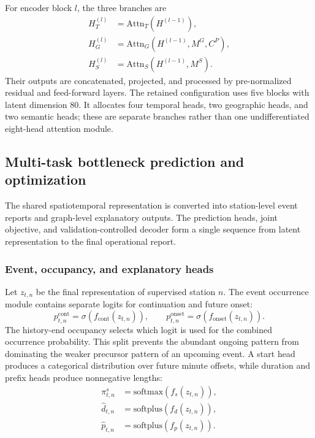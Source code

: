 \documentclass[a4paper,fleqn]{cas-dc}
\begin{document}
For encoder block $l$, the three branches are
\begin{equation}
\begin{aligned}
H_T^{(l)}&=\mathrm{Attn}_T(H^{(l-1)}),\\
H_G^{(l)}&=\mathrm{Attn}_G(H^{(l-1)},M^G,C^P),\\
H_S^{(l)}&=\mathrm{Attn}_S(H^{(l-1)},M^S).
\end{aligned}
\end{equation}
Their outputs are concatenated, projected, and processed by pre-normalized residual and feed-forward layers. The retained configuration uses five blocks with latent dimension 80. It allocates four temporal heads, two geographic heads, and two semantic heads; these are separate branches rather than one undifferentiated eight-head attention module.


\subsection{Multi-task bottleneck prediction and optimization}

The shared spatiotemporal representation is converted into station-level event reports and graph-level explanatory outputs. The prediction heads, joint objective, and validation-controlled decoder form a single sequence from latent representation to the final operational report.


\subsubsection{Event, occupancy, and explanatory heads}

Let $z_{t,n}$ be the final representation of supervised station $n$. The event occurrence module contains separate logits for continuation and future onset:
\begin{equation}
p^{\mathrm{cont}}_{t,n}=\sigma(f_{\mathrm{cont}}(z_{t,n})),
\qquad
p^{\mathrm{onset}}_{t,n}=\sigma(f_{\mathrm{onset}}(z_{t,n})).
\end{equation}
The history-end occupancy selects which logit is used for the combined occurrence probability. This split prevents the abundant ongoing pattern from dominating the weaker precursor pattern of an upcoming event. A start head produces a categorical distribution over future minute offsets, while duration and prefix heads produce nonnegative lengths:
\begin{equation}
\begin{aligned}
\pi^s_{t,n}&=\mathrm{softmax}(f_s(z_{t,n})),\\
\hat d_{t,n}&=\mathrm{softplus}(f_d(z_{t,n})),\\
\hat p_{t,n}&=\mathrm{softplus}(f_p(z_{t,n})).
\end{aligned}
\end{equation}
\end{document}
